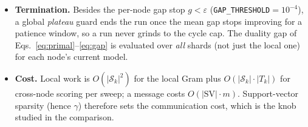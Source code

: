 \documentclass[11pt]{article}
\begin{document}
\begin{itemize}
  has not yet seen (\emph{versioned delta-send}), rather than the whole growing table
  every cycle.
\item \textbf{Termination.} Besides the per-node gap stop $g<\varepsilon$
  (\texttt{GAP\_THRESHOLD}$=10^{-4}$), a global \emph{plateau} guard ends the run once
  the mean gap stops improving for a patience window, so a run never grinds to the
  cycle cap. The duality gap of Eqs.~\eqref{eq:primal}--\eqref{eq:gap} is evaluated
  over \emph{all} shards (not just the local one) for each node's current model.
\item \textbf{Cost.} Local work is $O(|\mathcal{S}_k|^2)$ for the local Gram plus
  $O(|\mathcal{S}_k|\cdot|T_k|)$ for cross-node scoring per sweep; a message costs
  $O(|\mathrm{SV}|\cdot m)$. Support-vector sparsity (hence $\gamma$) therefore sets
  the communication cost, which is the knob studied in the comparison.
\end{itemize}
\end{document}
